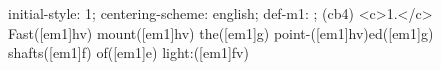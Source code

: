 initial-style: 1;
centering-scheme: english;
def-m1: \grealign;
(cb4) <c>1.</c> Fast([em1]hv) mount([em1]hv) the([em1]g) point-([em1]hv)ed([em1]g) shafts([em1]f) of([em1]e) light:([em1]fv)